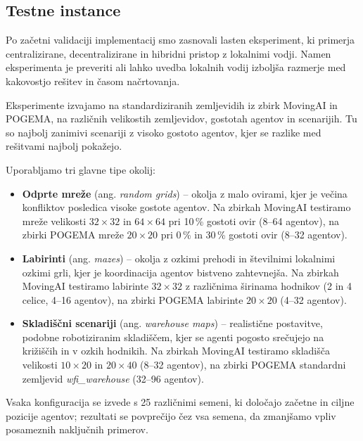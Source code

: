\documentclass[sigconf,nonacm]{acmart}
\begin{document}
\vspace{0.5em}
\noindent

\subsection{Testne instance}

Po začetni validaciji implementacij smo zasnovali lasten eksperiment, ki primerja centralizirane,
decentralizirane in hibridni pristop z lokalnimi vodji. Namen eksperimenta je preveriti ali lahko uvedba
lokalnih vodij izboljša razmerje med kakovostjo rešitev in časom načrtovanja.

Eksperimente izvajamo na standardiziranih zemljevidih iz zbirk MovingAI in POGEMA, na različnih velikostih
zemljevidov, gostotah agentov in scenarijih. Tu so najbolj zanimivi scenariji z visoko gostoto agentov,
kjer se razlike med rešitvami najbolj pokažejo.

Uporabljamo tri glavne tipe okolij:

\begin{itemize}
    \item \textbf{Odprte mreže} (ang. \textit{random grids}) – okolja z malo ovirami, kjer
    je večina konfliktov posledica visoke gostote agentov.
    Na zbirkah MovingAI testiramo mreže velikosti $32\times32$ in $64\times64$ pri
    10\,\% gostoti ovir (8--64 agentov), na zbirki POGEMA mreže $20\times20$ pri
    0\,\% in 30\,\% gostoti ovir (8--32 agentov).

    \item \textbf{Labirinti} (ang. \textit{mazes}) – okolja z ozkimi prehodi in številnimi lokalnimi ozkimi
    grli, kjer je koordinacija agentov bistveno zahtevnejša.
    Na zbirkah MovingAI testiramo labirinte $32\times32$ z različnima širinama hodnikov
    (2 in 4 celice, 4--16 agentov), na zbirki POGEMA labirinte $20\times20$ (4--32 agentov).

    \item \textbf{Skladiščni scenariji} (ang. \textit{warehouse maps}) – realistične postavitve, podobne
    robotiziranim skladiščem, kjer se agenti pogosto srečujejo na križiščih in v ozkih hodnikih.
    Na zbirkah MovingAI testiramo skladišča velikosti $10\times20$ in $20\times40$ (8--32 agentov),
    na zbirki POGEMA standardni zemljevid \textit{wfi\_warehouse} (32--96 agentov).
\end{itemize}

Vsaka konfiguracija se izvede s 25 različnimi semeni, ki določajo začetne in ciljne pozicije agentov;
rezultati se povprečijo čez vsa semena, da zmanjšamo vpliv posameznih naključnih primerov.
\end{document}
